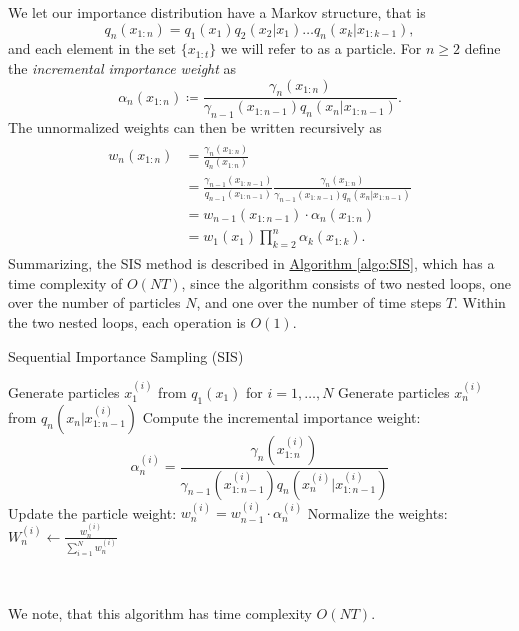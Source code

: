 We let our importance distribution have a Markov structure, that is
\[
q_n(x_{1:n})=q_1(x_1)q_2(x_2\vert x_1)\dots q_n(x_k\vert x_{1:k-1}),
\]
and each element in the set $\{x_{1:t}\}$ we will refer to as a particle. For $n\geq 2$ define the \emph{incremental importance weight} as
\[
\alpha_n(x_{1:n}) \coloneq \frac{\gamma_n(x_{1:n})}{\gamma_{n-1}(x_{1:n-1})q_n(x_n \vert x_{1:n-1})}.
\]
The unnormalized weights can then be written recursively as 
\begin{align}
	\begin{split}
		\label{eq:unnormalized_weights_recursive}
		w_n(x_{1:n})&=\frac{\gamma_n(x_{1:n})}{q_n(x_{1:n})} \\
		&=\frac{\gamma_{n-1}(x_{1:n-1})}{q_{n-1}(x_{1:n-1})}\frac{\gamma_n(x_{1:n})}{\gamma_{n-1}(x_{1:n-1})q_n(x_n\vert x_{1:n-1})} \\
		&=w_{n-1}(x_{1:n-1})\cdot \alpha_n(x_{1:n})  \\
		&=w_1(x_1) \prod_{k=2}^n \alpha_k(x_{1:k}).
	\end{split}
\end{align}
Summarizing, the \gls*{SIS} method is described in \hyperref[algo:SIS]{Algorithm \ref*{algo:SIS}}, which has a time complexity of $O(NT)$, since the algorithm consists of two nested loops, one over the number of particles $N$, and one over the number of time steps $T$. Within the two nested loops, each operation is $O(1)$.

\begin{algorithm}[H]
	\caption{Sequential Importance Sampling (SIS)}
	\label{algo:SIS}
	\begin{algorithmic}[1]
		\State Generate particles \(x_1^{(i)}\) from  \(q_1(x_1)\) for \( i = 1, \dots, N \)
		\State Generate particles \(x_n^{(i)}\) from \(q_n(x_n\vert x_{1:n-1}^{(i)})\) 
		\State Compute the incremental importance weight: 
		\[
		\alpha_n^{(i)} = \frac{\gamma_n(x_{1:n}^{(i)})}{\gamma_{n-1}(x_{1:n-1}^{(i)}) q_n(x_n^{(i)} \vert x_{1:n-1}^{(i)})} 
		\] 
		\State Update the particle weight: \( w_n^{(i)} = w_{n-1}^{(i)} \cdot \alpha_n^{(i)} \)
		\EndFor
		\State Normalize the weights: \(W_n^{(i)} \leftarrow \frac{w_n^{(i)}}{\sum_{i=1}^N w_n^{(i)}} \)
		\EndFor
	\end{algorithmic}\\
\end{algorithm}
We note, that this algorithm has time complexity $O(NT)$.

